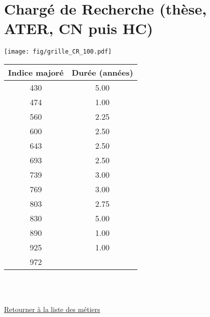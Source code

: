 \newpage 
 
\chapter{Chargé de Recherche (thèse, ATER, CN puis HC)} 

\begin{minipage}{0.55\linewidth}\texttt{[image: fig/grille\_CR\_100.pdf]}\end{minipage} 
\begin{minipage}{0.3\linewidth} 
 \begin{center} 

\begin{tabular}[htb]{|c|c|} 
\hline 
 Indice majoré &  Durée (années) \\ 
\hline \hline 
 430 &  5.00 \\ 
\hline 
 474 &  1.00 \\ 
\hline 
 560 &  2.25 \\ 
\hline 
 600 &  2.50 \\ 
\hline 
 643 &  2.50 \\ 
\hline 
 693 &  2.50 \\ 
\hline 
 739 &  3.00 \\ 
\hline 
 769 &  3.00 \\ 
\hline 
 803 &  2.75 \\ 
\hline 
 830 &  5.00 \\ 
\hline 
 890 &  1.00 \\ 
\hline 
 925 &  1.00 \\ 
\hline 
 972 &   \\ 
\hline 
\hline 
\end{tabular} 
\end{center} 
 \end{minipage} 

~\\ 
 


   
 \localtableofcontents 

~\\ 
 
 \hyperlink{page.2}{\noindent Retourner à la liste des métiers}

